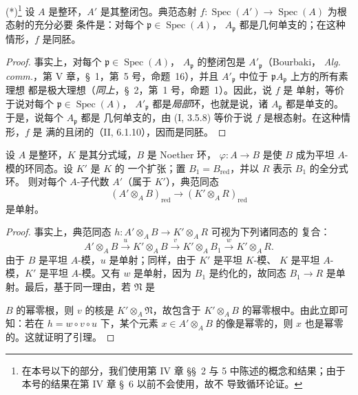 \begin{lemma}[23.2.2]
\label{0.23.2.2-fr}
\textnormal{(*)}\footnote{在本号以下的部分，我们使用第 IV 章 §§~2 与 5
中陈述的概念和结果；由于本号的结果在第 IV 章 §~6 以前不会使用，故不
导致循环论证。} 设 $A$ 是整环，$A'$ 是其整闭包。典范态射
$f:\operatorname{Spec}(A')\to\operatorname{Spec}(A)$ 为根态射的充分必要
条件是：对每个 $\mathfrak p\in\operatorname{Spec}(A)$，
$A_{\mathfrak p}$ 都是几何单支的；在这种情形，$f$ 是同胚。
\end{lemma}

\begin{proof}
事实上，对每个 $\mathfrak p\in\operatorname{Spec}(A)$，
$A_{\mathfrak p}$ 的整闭包是 $A'_{\mathfrak p}$（Bourbaki，
\emph{Alg. comm.}，第 V 章，§~1，第~5 号，命题~16），并且
$A'_{\mathfrak p}$ 中位于 $\mathfrak pA_{\mathfrak p}$ 上方的所有素理想
都是极大理想（\emph{同上}，§~2，第~1 号，命题~1）。因此，说 $f$ 是
单射，等价于说对每个 $\mathfrak p\in\operatorname{Spec}(A)$，
$A'_{\mathfrak p}$ 都是\emph{局部}环，也就是说，诸
$A_{\mathfrak p}$ 都是单支的。于是，说每个 $A_{\mathfrak p}$ 都是
几何单支的，由 (I, 3.5.8) 等价于说 $f$ 是根态射。在这种情形，$f$ 是
满的且闭的（II, 6.1.10），因而是同胚。
\end{proof}

\begin{lemma}[23.2.3]
\label{0.23.2.3-fr}
设 $A$ 是整环，$K$ 是其分式域，$B$ 是 Noether 环，
$\varphi:A\to B$ 是使 $B$ 成为平坦 $A$-模的环同态。设 $K'$ 是 $K$ 的
一个扩张；置 $B_1=B_{\mathrm{red}}$，并以 $R$ 表示 $B_1$ 的全分式环。
则对每个 $A$-子代数 $A'$（属于 $K'$），典范同态
\begin{equation}
\label{0.23.1.8.1-fr}
  (A'\otimes_AB)_{\mathrm{red}}
  \longrightarrow(K'\otimes_AR)_{\mathrm{red}}
  \tag{23.1.8.1}
\end{equation}
是单射。
\end{lemma}

\begin{proof}
事实上，典范同态 $h:A'\otimes_AB\to K'\otimes_AR$ 可视为下列诸同态的
复合：
\[
  A'\otimes_AB\xrightarrow{u}K'\otimes_AB
  \xrightarrow{v}K'\otimes_AB_1\xrightarrow{w}K'\otimes_AR.
\]
由于 $B$ 是平坦 $A$-模，$u$ 是单射；同样，由于 $K'$ 是平坦 $K$-模、
$K$ 是平坦 $A$-模，$K'$ 是平坦 $A$-模。又有 $w$ 是单射，因为
$B_1$ 是约化的，故同态 $B_1\to R$ 是单射。最后，基于同一理由，若
$\mathfrak N$ 是


$B$ 的幂零根，则 $v$ 的核是 $K'\otimes_A\mathfrak N$，故包含于
$K'\otimes_AB$ 的幂零根中。由此立即可知：若在
$h=w\circ v\circ u$ 下，某个元素 $x\in A'\otimes_AB$ 的像是幂零的，则 $x$
也是幂零的。这就证明了引理。
\end{proof}

